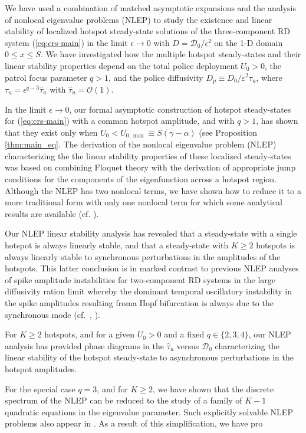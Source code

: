 \documentclass{article}%
\newcommand{\eps}{{\displaystyle \varepsilon}}
\begin{document}
We have used a combination of matched asymptotic expansions and the
analysis of nonlocal eigenvalue problems (NLEP) to study the existence
and linear stability of localized hotspot steady-state solutions of
the three-component RD system (\ref{eq:crs-main}) in the limit
$\epsilon\to 0$ with $D={{\mathcal D}_0/\epsilon^2}$ on the 1-D domain
$0\leq x\leq S$. We have investigated how the multiple hotspot
steady-states and their linear stability properties depend on the
total police deployment $U_0>0$, the patrol focus parameter $q>1$, and
the police diffusivity $D_p\equiv {D_0/\eps^2 \tau_u}$, where
$\tau_u=\epsilon^{q-3}\hat{\tau}_u$ with $\hat{\tau}_u={\mathcal
  O}(1)$.

In the limit $\epsilon\to 0$, our formal asymptotic construction of
hotspot steady-states for (\ref{eq:crs-main}) with a common hotspot
amplitude, and with $q>1$, has shown that they exist only when
$U_0<U_{0,\max}\equiv S(\gamma-\alpha)$ (see Proposition
\ref{thm:main_eq}. The derivation of the nonlocal eigenvalue problem (NLEP)
characterizing the the linear stability properties of these localized
steady-states was based on combining Floquet theory with the derivation of
appropriate jump conditions for the components of the eigenfunction across
a hotspot region. Although the NLEP has two nonlocal terms, we have shown
how to reduce it to a more traditional form with only one nonlocal term
for which some analytical results are available (cf. \cite{wei_rev}).

Our NLEP linear stability analysis has revealed that a steady-state
with a single hotspot is always linearly stable, and that a
steady-state with $K\geq 2$ hotspots is always linearly stable to
synchronous perturbations in the amplitudes of the hotspots. This
latter conclusion is in marked contrast to previous NLEP analyses of
spike amplitude instabilities for two-component RD systems in the
large diffusivity ration limit whereby the dominant temporal
oscillatory instability in the spike amplitudes resulting froma Hopf
bifurcation is always due to the synchronous mode (cf.~\cite{mjww_1},
\cite{kww_gs}).

For $K\geq 2$ hotspots, and for a given $U_0>0$ and a fixed $q\in
\lbrace{2,3,4\rbrace}$, our NLEP analysis has provided phase diagrams in
the $\hat{\tau}_u$ versus ${\mathcal D}_0$ characterizing the linear
stability of the hotspot steady-state to asynchronous perturbations in
the hotspot amplitudes. 

For the special case $q=3$, and for $K\geq 2$, we have shown that the
discrete spectrum of the NLEP can be reduced to the study of a family
of $K-1$ quadratic equations in the eigenvalue parameter.  Such
explicitly solvable NLEP problems also appear in
\cite{kww_crime,mtw_enlep,nec}. As a result of this simplification, we
have pro
\end{document}
